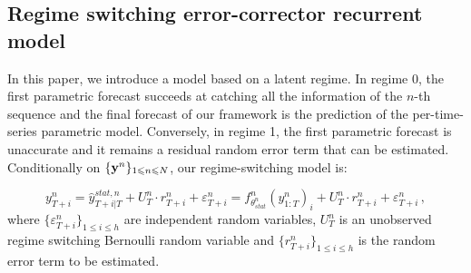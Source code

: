 \documentclass{article} %
\newcommand{\ts}{y}
\newcommand{\fullts}{{\bf \ts}}
\newcommand{\tspred}{\hat{\ts}}
\newcommand{\stat}{f}
\newcommand{\statparam}{\theta_{stat}}
\newcommand{\lag}{h}
\newcommand{\remainder}{r}
\newcommand{\hiddenregime}{U}
\begin{document}


\subsection{Regime switching error-corrector recurrent model}

In this paper, we introduce a model based on a latent regime. In regime 0, the first parametric forecast succeeds at catching all the information of the $n$-th sequence and the final forecast of our framework is the prediction of the per-time-series parametric model. Conversely, in regime 1, the first parametric forecast is unaccurate and it remains a residual random error term that can be estimated. %
Conditionally on $\{\fullts^n\}_{1\leqslant n\leqslant N}$, our regime-switching model is:

$$
\ts^n_{T+i} = \tspred^{stat,n}_{T+i|T} + \hiddenregime^n_T \cdot \remainder^{n}_{T+i} + \varepsilon^n_{T+i} = \stat^n_{\statparam^n}(\ts^n_{1:T})_i + \hiddenregime^n_T \cdot \remainder^{n}_{T+i} + \varepsilon^n_{T+i}\,,
$$
where $\{\varepsilon^n_{T+i}\}_{1\leqslant i\leqslant \lag}$ are independent random variables, $U^n_T$ is an unobserved regime switching Bernoulli random variable and $\{\remainder^n_{T+i}\}_{1\leqslant i\leqslant \lag}$ is the random error term to be estimated.
\end{document}
